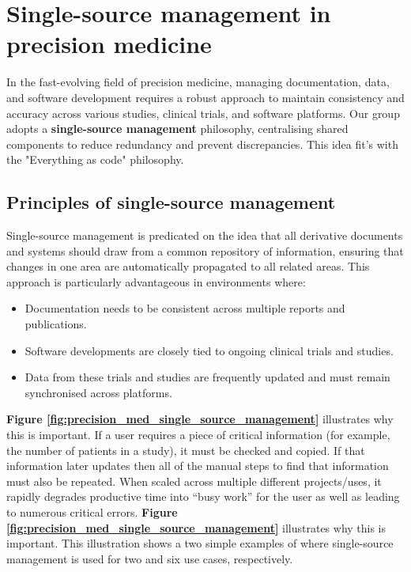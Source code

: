 \section{Single-source management in precision medicine}

In the fast-evolving field of precision medicine, managing documentation, data, and software development requires a robust approach to maintain consistency and accuracy across various studies, clinical trials, and software platforms. Our group adopts a \textbf{single-source management} philosophy, centralising shared components to reduce redundancy and prevent discrepancies.
This idea fit's with the "Everything as code" philosophy.


\subsection{Principles of single-source management}

Single-source management is predicated on the idea that all derivative documents and systems should draw from a common repository of information, ensuring that changes in one area are automatically propagated to all related areas. This approach is particularly advantageous in environments where:
\begin{itemize}
    \item Documentation needs to be consistent across multiple reports and publications.
    \item Software developments are closely tied to ongoing clinical trials and studies.
    \item Data from these trials and studies are frequently updated and must remain synchronised across platforms.
\end{itemize}


\textbf{Figure \ref{fig:precision_med_single_source_management}} illustrates why this is important. 
If a user requires a piece of critical information (for example, the number of patients in a study), it must be checked and copied. 
If that information later updates then all of the manual steps to find that information must also be repeated. 
When scaled across multiple different projects/uses, it rapidly degrades productive time into ``busy work'' for the user as well as leading to numerous critical errors.   
\textbf{Figure \ref{fig:precision_med_single_source_management}} illustrates why this is important. 
This illustration shows a two simple examples of where single-source management is used for two and six use cases, respectively. 

